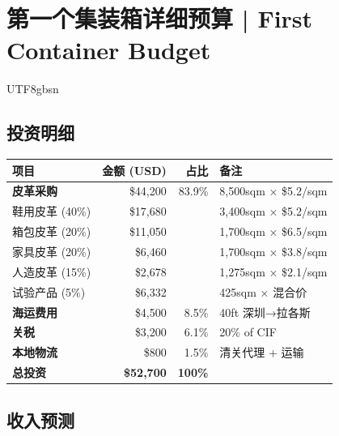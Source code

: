 \documentclass[12pt,a4paper]{article}
\begin{document}
\newpage

\section{第一个集装箱详细预算 | First Container Budget}

\begin{CJK}{UTF8}{gbsn}

\subsection{投资明细}

\begin{center}
\begin{longtable}{lrrp{4cm}}
\toprule
\textbf{项目} & \textbf{金额 (USD)} & \textbf{占比} & \textbf{备注} \\
\midrule
\textbf{皮革采购} & \$44,200 & 83.9\% & 8,500sqm × \$5.2/sqm \\
\quad 鞋用皮革 (40\%) & \$17,680 & & 3,400sqm × \$5.2/sqm \\
\quad 箱包皮革 (20\%) & \$11,050 & & 1,700sqm × \$6.5/sqm \\
\quad 家具皮革 (20\%) & \$6,460 & & 1,700sqm × \$3.8/sqm \\
\quad 人造皮革 (15\%) & \$2,678 & & 1,275sqm × \$2.1/sqm \\
\quad 试验产品 (5\%) & \$6,332 & & 425sqm × 混合价 \\
\textbf{海运费用} & \$4,500 & 8.5\% & 40ft 深圳→拉各斯 \\
\textbf{关税} & \$3,200 & 6.1\% & 20\% of CIF \\
\textbf{本地物流} & \$800 & 1.5\% & 清关代理 + 运输 \\
\midrule
\textbf{总投资} & \textbf{\$52,700} & \textbf{100\%} & \\
\bottomrule
\end{longtable}
\end{center}

\subsection{收入预测}


\end{CJK}
\end{document}
